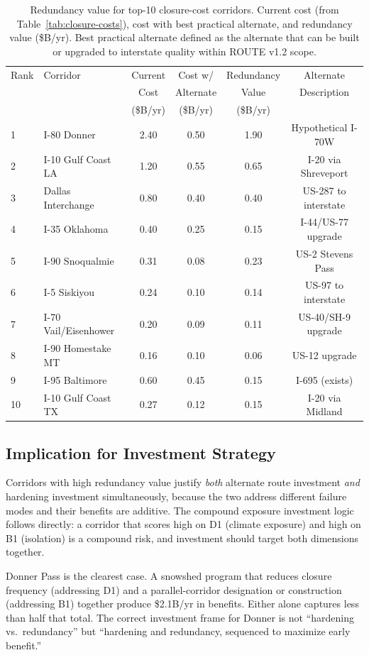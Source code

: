 \begin{table}[ht]
\centering
\caption{Redundancy value for top-10 closure-cost corridors. Current cost (from
Table~\ref{tab:closure-costs}), cost with best practical alternate, and redundancy
value (\$B/yr). Best practical alternate defined as the alternate that can be built
or upgraded to interstate quality within ROUTE v1.2 scope.}
\label{tab:redundancy-value}
\begin{tabular}{@{}llcccc@{}}
\toprule
Rank & Corridor & Current & Cost w/ & Redundancy & Alternate \\
     &          & Cost    & Alternate & Value     & Description \\
     &          & (\$B/yr) & (\$B/yr) & (\$B/yr) & \\
\midrule
1 & I-80 Donner          & 2.40 & 0.50 & 1.90 & Hypothetical I-70W \\
2 & I-10 Gulf Coast LA   & 1.20 & 0.55 & 0.65 & I-20 via Shreveport \\
3 & Dallas Interchange   & 0.80 & 0.40 & 0.40 & US-287 to interstate \\
4 & I-35 Oklahoma        & 0.40 & 0.25 & 0.15 & I-44/US-77 upgrade \\
5 & I-90 Snoqualmie      & 0.31 & 0.08 & 0.23 & US-2 Stevens Pass \\
6 & I-5 Siskiyou         & 0.24 & 0.10 & 0.14 & US-97 to interstate \\
7 & I-70 Vail/Eisenhower & 0.20 & 0.09 & 0.11 & US-40/SH-9 upgrade \\
8 & I-90 Homestake MT    & 0.16 & 0.10 & 0.06 & US-12 upgrade \\
9 & I-95 Baltimore       & 0.60 & 0.45 & 0.15 & I-695 (exists) \\
10 & I-10 Gulf Coast TX  & 0.27 & 0.12 & 0.15 & I-20 via Midland \\
\bottomrule
\end{tabular}
\end{table}

\subsection{Implication for Investment Strategy}

Corridors with high redundancy value justify \textit{both} alternate route investment
\textit{and} hardening investment simultaneously, because the two address different
failure modes and their benefits are additive. The compound exposure investment logic
\citep{ROUTE_B3} follows directly: a corridor that scores high on D1 (climate exposure)
and high on B1 (isolation) is a compound risk, and investment should target both
dimensions together.

Donner Pass is the clearest case. A snowshed program that reduces closure frequency
(addressing D1) and a parallel-corridor designation or construction (addressing B1)
together produce \$2.1B/yr in benefits. Either alone captures less than half that total.
The correct investment frame for Donner is not ``hardening vs.\ redundancy'' but
``hardening and redundancy, sequenced to maximize early benefit.''
